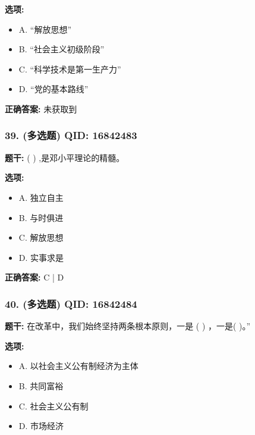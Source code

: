 \documentclass[12pt,UTF8]{ctexart}
\begin{document}
\textbf{选项:}
\begin{itemize}[leftmargin=*]

  \item A. “解放思想”

  \item B. “社会主义初级阶段”

  \item C. “科学技术是第一生产力”

  \item D. “党的基本路线”

\end{itemize}

\textbf{正确答案:}
未获取到

\vspace{0.3em}\hrulefill\vspace{0.7em}

\subsubsection*{39. (多选题) \small QID: 16842483}

\textbf{题干:}
( ) ,是邓小平理论的精髓。

\textbf{选项:}
\begin{itemize}[leftmargin=*]

  \item A. 独立自主

  \item B. 与时俱进

  \item C. 解放思想

  \item D. 实事求是

\end{itemize}

\textbf{正确答案:}
C | D

\vspace{0.3em}\hrulefill\vspace{0.7em}

\subsubsection*{40. (多选题) \small QID: 16842484}

\textbf{题干:}
在改革中，我们始终坚持两条根本原则，一是 ( ) ，一是( )。”

\textbf{选项:}
\begin{itemize}[leftmargin=*]

  \item A. 以社会主义公有制经济为主体

  \item B. 共同富裕

  \item C. 社会主义公有制

  \item D. 市场经济

\end{itemize}
\end{document}
